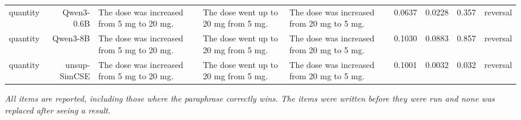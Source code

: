 \documentclass[10pt]{article}
\begin{document}
\begin{longtable}{lr>{\raggedright\arraybackslash}p{4.6cm}>{\raggedright\arraybackslash}p{4.6cm}>{\raggedright\arraybackslash}p{4.6cm}rrrr}
quantity & Qwen3-0.6B & The dose was increased from 5 mg to 20 mg. & The dose went up to 20 mg from 5 mg. & The dose was increased from 20 mg to 5 mg. & 0.0637 & 0.0228 & 0.357 & reversal \\
quantity & Qwen3-8B & The dose was increased from 5 mg to 20 mg. & The dose went up to 20 mg from 5 mg. & The dose was increased from 20 mg to 5 mg. & 0.1030 & 0.0883 & 0.857 & reversal \\
quantity & unsup-SimCSE & The dose was increased from 5 mg to 20 mg. & The dose went up to 20 mg from 5 mg. & The dose was increased from 20 mg to 5 mg. & 0.1001 & 0.0032 & 0.032 & reversal \\
\end{longtable}
\normalsize

\textit{All items are reported, including those where the paraphrase correctly wins. The items were written before they were run and none was replaced after seeing a result.}
\clearpage
\end{document}
